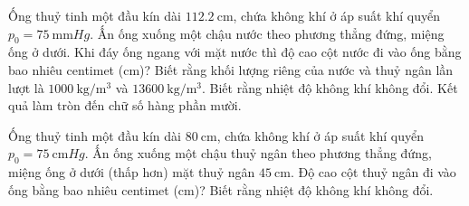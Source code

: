 \begin{ex}
	Ống thuỷ tinh một đầu kín dài $\SI{112.2}{\centi\meter}$, chứa không khí ở áp suất khí quyển $p_0=\SI{75}{\milli\meter Hg}$. Ấn ống xuống một chậu nước theo phương thẳng đứng, miệng ống ở dưới. Khi đáy ống ngang với mặt nước thì độ cao cột nước đi vào ống bằng bao nhiêu centimet (\si{\centi\meter})? Biết rằng khối lượng riêng của nước  và thuỷ ngân lần lượt là $\SI{1000}{\kilogram/\meter^3}$ và $\SI{13600}{\kilogram/\meter^3}$. Biết rằng nhiệt độ không khí không đổi. Kết quả làm tròn đến chữ số hàng phần mười.
\end{ex}
\begin{ex}
	Ống thuỷ tinh một đầu kín dài $\SI{80}{\centi\meter}$, chứa không khí ở áp suất khí quyển $p_0=\SI{75}{\centi\meter Hg}$. Ấn ống xuống một chậu thuỷ ngân theo phương thẳng đứng, miệng ống ở dưới (thấp hơn) mặt thuỷ ngân $\SI{45}{\centi\meter}$. Độ cao cột thuỷ ngân đi vào ống bằng bao nhiêu centimet (\si{\centi\meter})? Biết rằng nhiệt độ không khí không đổi.
\end{ex}
